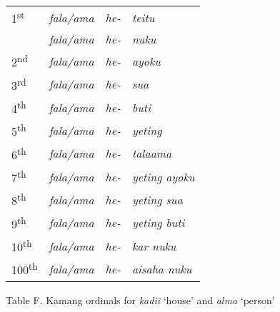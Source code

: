 \begin{flushleft}
\tablehead{}
\begin{supertabular}{m{0.5191598in}m{0.7761598in}m{0.41295984in}m{3.07196in}}
1\textsuperscript{st} &
\textit{fala/ama} &
\textit{he-} &
\textit{teitu}\\
 &
\textit{fala/ama} &
\textit{he-} &
\textit{nuku }\\
2\textsuperscript{nd} &
\textit{fala/ama} &
\textit{he-} &
\textit{ayoku}\\
3\textsuperscript{rd} &
\textit{fala/ama} &
\textit{he-} &
\textit{sua}\\
4\textsuperscript{th} &
\textit{fala/ama} &
\textit{he-} &
\textit{buti}\\
5\textsuperscript{th} &
\textit{fala/ama} &
\textit{he-} &
\textit{yeting}\\
6\textsuperscript{th} &
\textit{fala/ama} &
\textit{he-} &
\textit{talaama}\\
7\textsuperscript{th} &
\textit{fala/ama} &
\textit{he-} &
\textit{yeting ayoku}\\
8\textsuperscript{th} &
\textit{fala/ama} &
\textit{he-} &
\textit{yeting sua}\\
9\textsuperscript{th} &
\textit{fala/ama} &
\textit{he-} &
\textit{yeting buti}\\
10\textsuperscript{th} &
\textit{fala/ama} &
\textit{he-} &
\textit{kar nuku}\\
100\textsuperscript{th} &
\textit{fala/ama} &
\textit{he-} &
\textit{aisaha nuku}\\
\end{supertabular}
\end{flushleft}
Table F. Kamang ordinals for \textit{kadii} {\textquoteleft}house{\textquoteright} and \textit{alma }{\textquoteleft}person{\textquoteright}

